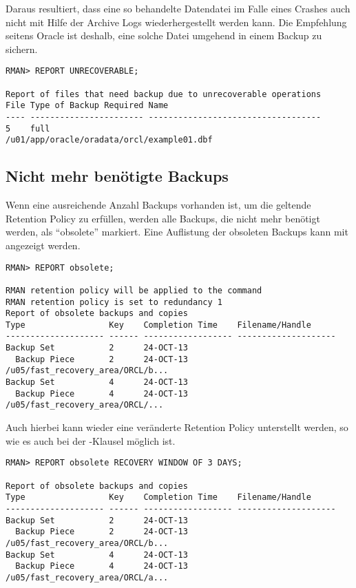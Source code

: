         Daraus resultiert, dass eine so behandelte Datendatei im Falle eines
        Crashes auch nicht mit Hilfe der Archive Logs wiederhergestellt werden
        kann. Die Empfehlung seitens Oracle ist deshalb, eine solche Datei
        umgehend in einem Backup zu sichern.
        \begin{lstlisting}[caption={Datenbankdateien die nicht rekonstruierbare Operationen enthalten aufspüren},label=admin1356,language=rman]
RMAN> REPORT UNRECOVERABLE;

Report of files that need backup due to unrecoverable operations
File Type of Backup Required Name
---- ----------------------- -----------------------------------
5    full                    /u01/app/oracle/oradata/orcl/example01.dbf
        \end{lstlisting}
      \subsection{Nicht mehr benötigte Backups}
        Wenn eine ausreichende Anzahl Backups vorhanden ist, um die geltende
        Retention Policy zu erfüllen, werden alle Backups, die nicht mehr
        benötigt werden, als \enquote{obsolete} markiert. Eine Auflistung der
        obsoleten Backups kann mit  angezeigt werden.
        \begin{lstlisting}[caption={Backups die nicht mehr benötigt werden anzeigen},label=admin1357,language=rman]
RMAN> REPORT obsolete;

RMAN retention policy will be applied to the command
RMAN retention policy is set to redundancy 1
Report of obsolete backups and copies
Type                 Key    Completion Time    Filename/Handle
-------------------- ------ ------------------ --------------------
Backup Set           2      24-OCT-13
  Backup Piece       2      24-OCT-13          /u05/fast_recovery_area/ORCL/b...
Backup Set           4      24-OCT-13
  Backup Piece       4      24-OCT-13          /u05/fast_recovery_area/ORCL/...
        \end{lstlisting}
        Auch hierbei kann wieder eine veränderte Retention Policy unterstellt werden, so wie es auch bei der -Klausel möglich ist.
        \begin{lstlisting}[caption={Backups die nicht mehr benötigt werden anzeigen},label=admin1358,language=rman]
RMAN> REPORT obsolete RECOVERY WINDOW OF 3 DAYS;

Report of obsolete backups and copies
Type                 Key    Completion Time    Filename/Handle
-------------------- ------ ------------------ --------------------
Backup Set           2      24-OCT-13
  Backup Piece       2      24-OCT-13          /u05/fast_recovery_area/ORCL/b...
Backup Set           4      24-OCT-13
  Backup Piece       4      24-OCT-13          /u05/fast_recovery_area/ORCL/a...
        \end{lstlisting}
